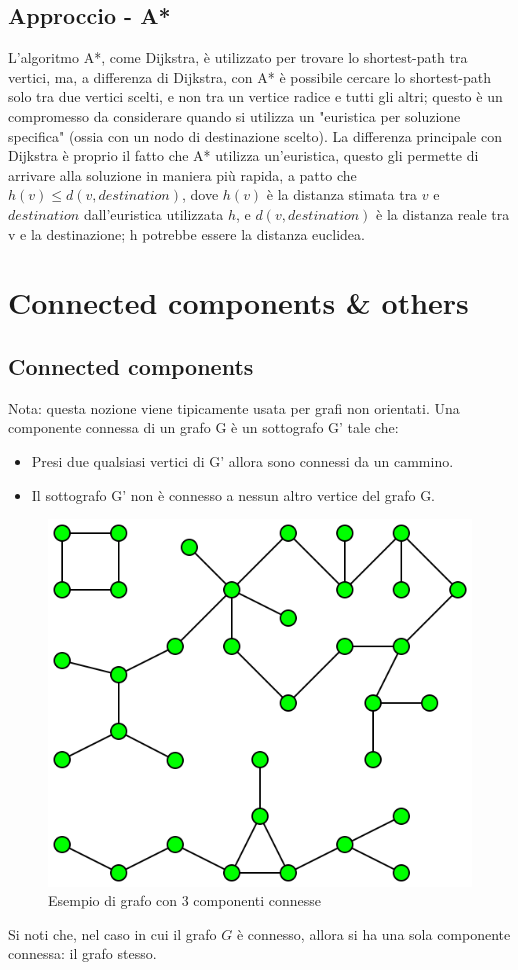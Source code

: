 \documentclass[12pt,a4paper]{article}
\begin{document}
\subsection{Approccio - A*}
L'algoritmo A*, come Dijkstra, è utilizzato per trovare lo shortest-path tra vertici, ma, a differenza di Dijkstra, con A* è possibile cercare lo shortest-path solo tra due vertici scelti, e non tra un vertice radice e tutti gli altri; questo è un compromesso da considerare quando si utilizza un "euristica per soluzione specifica" (ossia con un nodo di destinazione scelto). La differenza principale con Dijkstra è proprio il fatto che A* utilizza un'euristica, questo gli permette di arrivare alla soluzione in maniera più rapida, a patto che $h(v) \leq d(v, destination)$, dove $h(v)$ è la distanza stimata tra $v$ e $destination$ dall'euristica utilizzata $h$, e $d(v, destination)$ è la distanza reale tra v e la destinazione; h potrebbe essere la distanza euclidea.

\pagebreak
\section{Connected components \& others}

\subsection{Connected components}
Nota: questa nozione viene tipicamente usata per grafi non orientati. Una componente connessa di un grafo G è un sottografo G' tale che:
\begin{itemize}
\item Presi due qualsiasi vertici di G' allora sono connessi da un cammino.
\item Il sottografo G' non è connesso a nessun altro vertice del grafo G.
\end{itemize}
\begin{figure}[h]
	\centering
	\includegraphics[width=0.5\linewidth]{img/conn_comp.png}
	\caption{Esempio di grafo con 3 componenti connesse}
	\label{fig:7}
\end{figure}
Si noti che, nel caso in cui il grafo $G$ è connesso, allora si ha una sola componente connessa: il grafo stesso.
\end{document}
